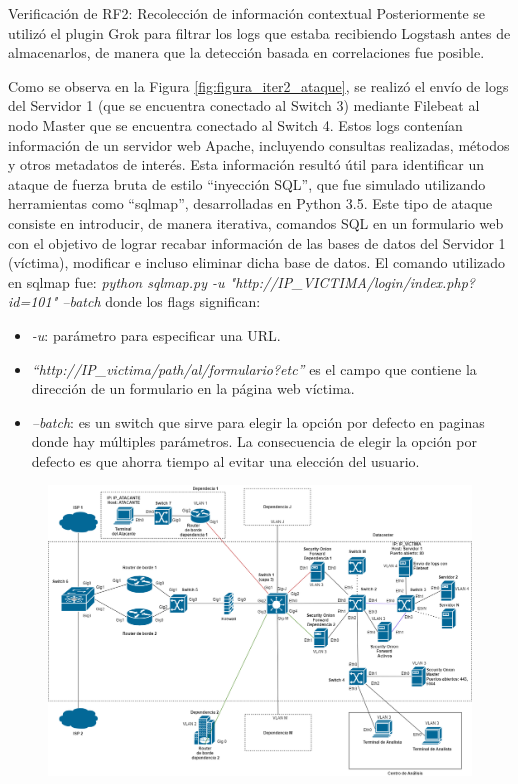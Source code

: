\begin{section}{Verificación de RF2: Recolección de información contextual}
     Posteriormente se utilizó el plugin Grok para filtrar los logs que estaba recibiendo Logstash antes de almacenarlos, de manera que la detección basada en correlaciones fue posible.\par
      Como se observa en la Figura \ref{fig:figura_iter2_ataque}, se realizó el envío de logs del Servidor 1 (que se encuentra conectado al Switch 3) mediante Filebeat al nodo Master que se encuentra conectado al Switch 4. Estos logs contenían información de un servidor web Apache, incluyendo consultas realizadas, métodos y otros metadatos de interés. Esta información resultó útil para identificar un ataque de fuerza bruta de estilo “inyección SQL”, que fue simulado utilizando herramientas como “sqlmap”, desarrolladas en Python 3.5. Este tipo de ataque consiste en introducir, de manera iterativa, comandos SQL en un formulario web con el objetivo de lograr recabar información de las bases de datos del Servidor 1 (víctima), modificar e incluso eliminar dicha base de datos. El comando utilizado en sqlmap fue: 
      \textit{python sqlmap.py -u "http://IP\_VICTIMA/login/index.php?id=101" --batch} donde los flags significan:
      \begin{itemize}
          \item \textit{-u}: parámetro para especificar una URL.
          \item \textit{“http://IP\_victima/path/al/formulario?etc”} es el campo que contiene la dirección de un formulario en la página web víctima.
          \item \textit{--batch}: es un switch que sirve para elegir la opción por defecto en paginas donde hay múltiples parámetros. La consecuencia de elegir la opción por defecto es que ahorra tiempo al evitar una elección del usuario.
      \end{itemize}
    \begin{figure}[H]
        \centering
        \includegraphics[width=1\textwidth]{./iteracion_2_imagenes/figura_iter2_ataque.png}

\end{figure}
\end{section}
